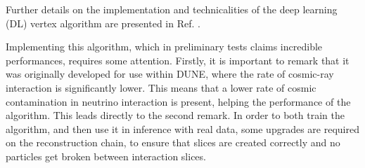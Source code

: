 Further details on the implementation and technicalities of the deep learning (DL) vertex algorithm are presented in Ref. \cite{DUNE:2025wti}. 

Implementing this algorithm, which in preliminary tests claims incredible performances, requires some attention. Firstly, it is important to remark that it was originally developed for use within DUNE, where the rate of cosmic-ray interaction is significantly lower. This means that a lower rate of cosmic contamination in neutrino interaction is present, helping the performance of the algorithm. This leads directly to the second remark. In order to both train the algorithm, and then use it in inference with real data, some upgrades are required on the reconstruction chain, to ensure that slices are created correctly and no particles get broken between interaction slices. 



